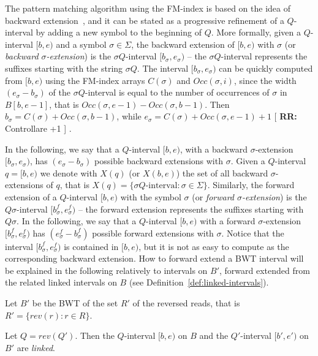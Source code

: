 \documentclass[runningheads,envcountsame,a4paper]{llncs}
\newcommand{\notaestesa}[2]{%
 \marginpar{\color{red!75!black}\textbf{\texttimes}}%
 {\color{red!75!black}%
 [\,\textbullet\,\textsf{\textbf{#1:}} %
 \textsf{\footnotesize#2}\,\textbullet\,]}%
}
\begin{document}
The pattern matching algorithm using the FM-index is based on the idea of backward extension~\cite{Ferragina2005},
and it can be stated as a progressive refinement of a $Q$-interval by adding a new symbol to the beginning of $Q$.
More formally, given a $Q$-interval $[b,e)$ and a symbol $\sigma \in \Sigma$, the backward
extension of $[b,e)$ with $\sigma$ (or \emph{backward
$\sigma$-extension}) is the $\sigma Q$-interval $[b_{\sigma},e_{\sigma})$
-- the $\sigma Q$-interval represents the  suffixes starting with
the string $\sigma Q$. The interval $[b_{\sigma},e_{\sigma})$ can be quickly computed
from $[b,e)$ using the FM-index arrays $C(\sigma)$ and
$Occ(\sigma, i)$, since the width $(e_{\sigma}-b_{\sigma})$ of the $\sigma Q$-interval is equal
to the number of occurrences of  $\sigma$ in $B[b,e-1]$, that is $Occ(\sigma, e-1)-Occ(\sigma, b-1)$. Then $b_{\sigma} =C(\sigma) + Occ(\sigma, b-1)$, while $e_{\sigma} =C(\sigma) + Occ(\sigma, e-1) +1 $ \notaestesa{RR}{Controllare +1}.

In the following,
we say that a  $Q$-interval $[b,e)$, with a backward $\sigma$-extension $[b_{\sigma},e_{\sigma})$, has $(e_{\sigma}-b_{\sigma})$ possible backward
extensions with $\sigma$.
Given a $Q$-interval $q=[b,e)$ we denote with $X(q)$ (or $X(b,e)$)
the set of all  backward $\sigma$-extensions of $q$, that is $X(q)=\{ \sigma Q\text{-interval}: \sigma\in\Sigma\}$.
Similarly, the forward extension of a $Q$-interval $[b,e)$ with the symbol
$\sigma$ (or  \emph{forward $\sigma$-extension}) is the
$Q \sigma$-interval $[b^f_{\sigma},e^f_{\sigma})$ -- the forward extension represents the suffixes
starting with $Q \sigma$. In the following, we say that a
$Q$-interval $[b,e)$ with  a forward $\sigma$-extension
$[b^f_{\sigma},e^f_{\sigma})$ has $(e^f_{\sigma}-b^f_{\sigma})$
possible forward extensions with $\sigma$. Notice that the interval
$[b^f_{\sigma},e^f_{\sigma})$ is contained in $[b,e)$, but it is not as easy to compute as the corresponding backward extension. How to forward extend a BWT interval will be explained in the following relatively to intervals on $B'$, forward extended from the related linked intervals on $B$ (see Definition~\ref{def:linked-intervals}).

Let $B'$ be the BWT of the set $R'$ of the reversed reads,
that is $R' = \{ rev(r): r \in R\}$.

\begin{definition}
\label{def:linked-intervals}
Let  $Q=rev(Q')$.
Then the $Q$-interval $[b,e)$ on $B$ and the $Q'$-interval $[b',e')$ on $B'$ are
\emph{linked}.
\end{definition}
\end{document}
